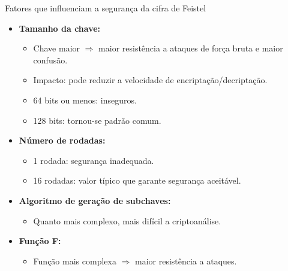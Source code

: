 \begin{frame}{Fatores que influenciam a segurança da cifra de Feistel}
\begin{itemize}
    \item \textbf{Tamanho da chave:} 
    \begin{itemize}
        \item Chave maior $\Rightarrow$ maior resistência a ataques de força bruta e maior confusão.
        \item Impacto: pode reduzir a velocidade de encriptação/decriptação.
        \item 64 bits ou menos: inseguros.
        \item 128 bits: tornou-se padrão comum.
    \end{itemize}

    \item \textbf{Número de rodadas:} 
    \begin{itemize}
        \item 1 rodada: segurança inadequada.
        \item 16 rodadas: valor típico que garante segurança aceitável.
    \end{itemize}

    \item \textbf{Algoritmo de geração de subchaves:} 
    \begin{itemize}
        \item Quanto mais complexo, mais difícil a criptoanálise.
    \end{itemize}

    \item \textbf{Função F:} 
    \begin{itemize}
        \item Função mais complexa $\Rightarrow$ maior resistência a ataques.
    \end{itemize}
\end{itemize}
\end{frame}

